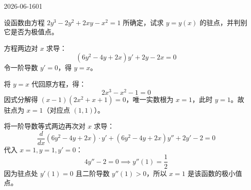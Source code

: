 \begin{mistake}{2026-06-16}{01}

\begin{problemcontent}
设函数由方程 \(2y^3 - 2y^2 + 2xy - x^2 = 1\) 所确定，试求 \(y = y(x)\) 的驻点，并判别它是否为极值点。
\end{problemcontent}

\begin{solutioncontent}
方程两边对 \(x\) 求导：
\[ (6y^2 - 4y + 2x)y' + 2y - 2x = 0 \]
令一阶导数 \(y' = 0\)，得 \(y = x\)。

将 \(y = x\) 代回原方程，得：
\[ 2x^3 - x^2 - 1 = 0 \]
因式分解得 \((x - 1)(2x^2 + x + 1) = 0\)，唯一实数根为 \(x = 1\)，此时 \(y = 1\)。故驻点为 \(x = 1\)（对应点 \((1,1)\)）。

将一阶导数等式两边再次对 \(x\) 求导：
\[ \frac{d}{dx}(6y^2 - 4y + 2x) \cdot y' + (6y^2 - 4y + 2x)y'' + 2y' - 2 = 0 \]
代入 \(x=1, y=1, y'=0\)：
\[ 4y'' - 2 = 0 \implies y''(1) = \frac{1}{2} \]
因为驻点处 \(y'(1) = 0\) 且二阶导数 \(y''(1) > 0\)，所以 \(x = 1\) 是该函数的极小值点。
\end{solutioncontent}


\end{mistake}
